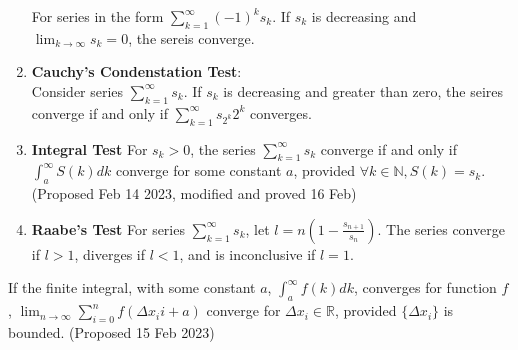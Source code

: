 \documentclass[../note.tex]{subfiles}
\begin{document}
\begin{theorem}
\begin{enumerate}
		For series in the form $\sum^{\infty}_{k=1}(-1)^{k}s_k$. If $s_k$ is decreasing and $\lim_{k\to \infty} s_k = 0$, the sereis converge. 
	\item \label{Cauchy_Condensation_Test} \textbf{Cauchy's Condenstation Test}:\\
		Consider series $\sum^{\infty}_{k=1}s_k$. If ${s_k}$ is decreasing and greater than zero, the seires converge if and only if $\sum^{\infty}_{k=1}s_{2^k}2^k $ converges. 
	\item \textbf{Integral Test}\label{IntegralTest}
		For $s_k>0$, the series $\sum^{\infty}_{k=1}s_k$ converge if and only if $\int_{a}^{\infty}S(k)dk$ converge for some constant $a$, provided $\forall k \in \mathbb{N}, S(k)=s_k$.
		(Proposed Feb 14 2023, modified and proved 16 Feb)
	\item \textbf{Raabe's Test}\label{Raabe's Test}
		For series $\sum^{\infty}_{k=1}s_k$, let $l= \displaystyle n\left(1-\frac{s_{n+1}}{s_n}\right)$. The series converge if $l>1$, diverges if $l<1$, and is inconclusive if $l=1$.

\end{enumerate}
\end{theorem}

\begin{hypothesis}\label{hypothesis:Finite Riamenn Sum}
	If the finite integral, with some constant $a$, $\int_{a}^{\infty}f(k)dk$, converges for function $f$, $\lim_{n \to \infty}\sum^{n}_{i=0} f(\Delta x_ii + a)$ converge for $\Delta x_i \in \mathbb{R}$, provided $\{\Delta x_i\}$ is bounded. (Proposed 15 Feb 2023)
\end{hypothesis}
\end{document}
